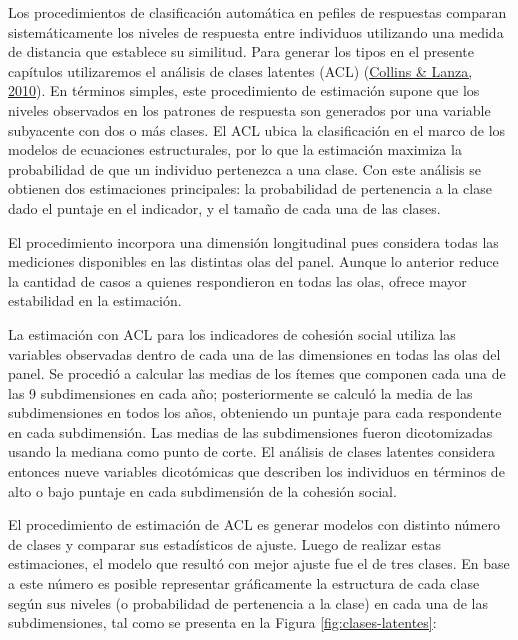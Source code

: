 \documentclass[
  12pt,
]{book}
\begin{document}
Los procedimientos de clasificación automática en pefiles de respuestas comparan sistemáticamente los niveles de respuesta entre individuos utilizando una medida de distancia que establece su similitud. Para generar los tipos en el presente capítulos utilizaremos el análisis de clases latentes (ACL) (\protect\hyperlink{ref-collins_latent_2010}{Collins \& Lanza, 2010}). En términos simples, este procedimiento de estimación supone que los niveles observados en los patrones de respuesta son generados por una variable subyacente con dos o más clases. El ACL ubica la clasificación en el marco de los modelos de ecuaciones estructurales, por lo que la estimación maximiza la probabilidad de que un individuo pertenezca a una clase. Con este análisis se obtienen dos estimaciones principales: la probabilidad de pertenencia a la clase dado el puntaje en el indicador, y el tamaño de cada una de las clases.

El procedimiento incorpora una dimensión longitudinal pues considera todas las mediciones disponibles en las distintas olas del panel. Aunque lo anterior reduce la cantidad de casos a quienes respondieron en todas las olas, ofrece mayor estabilidad en la estimación.

La estimación con ACL para los indicadores de cohesión social utiliza las variables observadas dentro de cada una de las dimensiones en todas las olas del panel. Se procedió a calcular las medias de los ítemes que componen cada una de las 9 subdimensiones en cada año; posteriormente se calculó la media de las subdimensiones en todos los años, obteniendo un puntaje para cada respondente en cada subdimensión. Las medias de las subdimensiones fueron dicotomizadas usando la mediana como punto de corte. El análisis de clases latentes considera entonces nueve variables dicotómicas que describen los individuos en términos de alto o bajo puntaje en cada subdimensión de la cohesión social.

El procedimiento de estimación de ACL es generar modelos con distinto número de clases y comparar sus estadísticos de ajuste. Luego de realizar estas estimaciones, el modelo que resultó con mejor ajuste fue el de tres clases. En base a este número es posible representar gráficamente la estructura de cada clase según sus niveles (o probabilidad de pertenencia a la clase) en cada una de las subdimensiones, tal como se presenta en la Figura \ref{fig:clases-latentes}:
\end{document}
